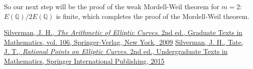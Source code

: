 \documentclass[11pt]{article}
\newcommand{\<}{\langle}
\renewcommand{\>}{\rangle}
\numberwithin{equation}{section}
\theoremstyle{plain}
\theoremstyle{definition}
\begin{document}
So our next step will be the proof of the weak Mordell-Weil theorem for \(m=2\): \(E(\mathbb{Q})/2E(\mathbb{Q})\) is finite, which completes the proof of the Mordell-Weil theorem.
\begin{thebibliography}{}

\bibitem{}
 \href{https://www.springer.com/la/book/9780387094939}{Silverman, J. H.,
 \emph{The Arithmetic of Elliptic Curves}. 2nd ed.,
 Graduate Texts in Mathematics, vol. 106, Springer-Verlag, New York,~2009}
\bibitem{}
 \href{https://books.google.co.kr/books?id=2_PLCQAAQBAJ&printsec=frontcover&dq=Rational+Points+on+Elliptic+Curves&hl=ko&sa=X&ved=0ahUKEwiahcaz_ZDhAhWUxIsBHfEdBtUQ6AEIMTAB#v=onepage&q=Rational%20Points%20on%20Elliptic%20Curves&f=false}{Silverman, J. H., Tate, J. T.,
 \emph{Rational Points on Elliptic Curves}. 2nd ed., Undergraduate Texts in Mathematics, Springer International Publishing, 2015}
\end{thebibliography}
\end{document}

